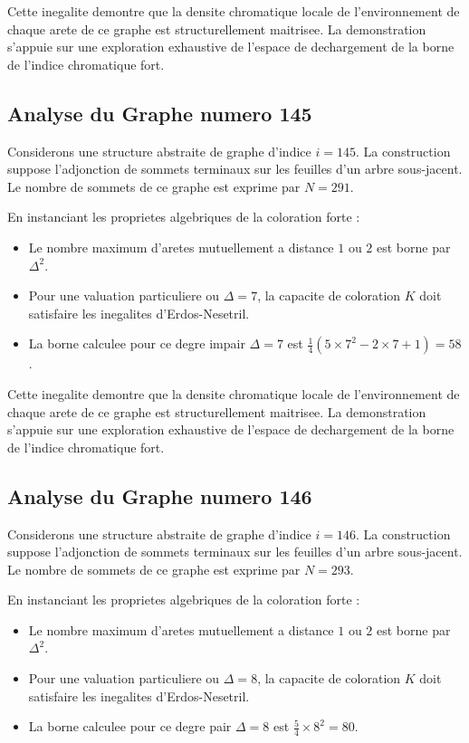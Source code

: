 \documentclass[11pt,a4paper]{article}
\begin{document}
Cette inegalite demontre que la densite chromatique locale de l'environnement de chaque arete de ce graphe est structurellement maitrisee. La demonstration s'appuie sur une exploration exhaustive de l'espace de dechargement de la borne de l'indice chromatique fort.

\subsection{Analyse du Graphe numero 145}
Considerons une structure abstraite de graphe d'indice $i = 145$. La construction suppose l'adjonction de sommets terminaux sur les feuilles d'un arbre sous-jacent. Le nombre de sommets de ce graphe est exprime par $N = 291$.

En instanciant les proprietes algebriques de la coloration forte :
\begin{itemize}
\item Le nombre maximum d'aretes mutuellement a distance $1$ ou $2$ est borne par $\Delta^2$.
\item Pour une valuation particuliere ou $\Delta = 7$, la capacite de coloration $K$ doit satisfaire les inegalites d'Erdos-Nesetril.
\item La borne calculee pour ce degre impair $\Delta = 7$ est $\frac{1}{4}(5 \times 7^2 - 2 \times 7 + 1) = 58$.
\end{itemize}

Cette inegalite demontre que la densite chromatique locale de l'environnement de chaque arete de ce graphe est structurellement maitrisee. La demonstration s'appuie sur une exploration exhaustive de l'espace de dechargement de la borne de l'indice chromatique fort.

\subsection{Analyse du Graphe numero 146}
Considerons une structure abstraite de graphe d'indice $i = 146$. La construction suppose l'adjonction de sommets terminaux sur les feuilles d'un arbre sous-jacent. Le nombre de sommets de ce graphe est exprime par $N = 293$.

En instanciant les proprietes algebriques de la coloration forte :
\begin{itemize}
\item Le nombre maximum d'aretes mutuellement a distance $1$ ou $2$ est borne par $\Delta^2$.
\item Pour une valuation particuliere ou $\Delta = 8$, la capacite de coloration $K$ doit satisfaire les inegalites d'Erdos-Nesetril.
\item La borne calculee pour ce degre pair $\Delta = 8$ est $\frac{5}{4} \times 8^2 = 80$.
\end{itemize}
\end{document}
